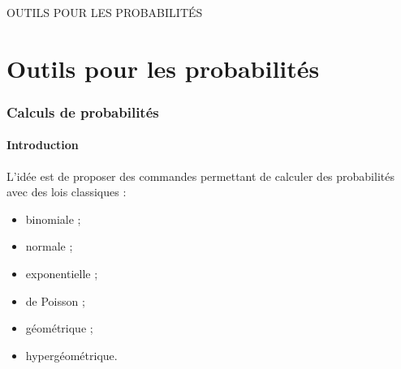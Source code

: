 \documentclass[a4paper,french,11pt]{article}
\begin{document}
\begin{PresCodePL}{}

\end{PresCodePL}

\newpage

\phantom{t}\par\vfill\par
\begin{PART}
	\begin{center}
		\Huge\MakeUppercase{Outils pour les probabilités}
	\end{center}
\end{PART}
\par\vfill\par\phantom{t}

\newpage

\part{Outils pour les probabilités}

\section{Calculs de probabilités}\label{calcprobas}

\subsection{Introduction}

\begin{tipblock}
L'idée est de proposer des commandes permettant de calculer des probabilités avec des lois classiques :

\begin{itemize}
	\item binomiale ;
	\item normale ;
	\item exponentielle ;
	\item de Poisson ;
	\item géométrique ;
	\item hypergéométrique.
\end{itemize}
\vspace*{-\baselineskip}\leavevmode
\end{tipblock}
\end{document}
